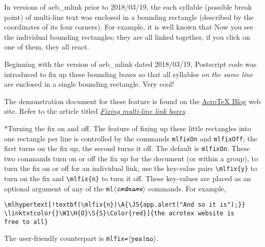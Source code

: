 \documentclass{article}
\makeatletter
\def\amtIndent{15pt}
\def\AcroTeX{Acro\negthinspace\TeX}
\def\anglemeta#1{$\langle\textit{\texttt{#1}}\rangle$}
\let\ameta\anglemeta
\let\pkg\textsf
\def\cs#1{\texttt{\@backslashchar#1}}
\renewcommand{\paragraph}
    {\@startsection{paragraph}{4}{0pt}{6pt}{-3pt}{\bfseries}}
\makeatother
\begin{document}
In versions of \pkg{aeb\_mlink} prior to 2018/03/19, the each syllable
(possible break point) of multi-line text was enclosed in a bounding
rectangle (described by the coordinates of its four corners). For example, it
is well known that  Now you see the individual bounding
rectangles; they are all linked together, if you click on one of them, they
all react.

Beginning with the version of \pkg{aeb\_mlink} dated 2018/03/19, Postscript
code was introduced to fix up these bounding boxes so that all syllables
\emph{on the same line} are enclosed in a single bounding rectangle.
 Very cool!

 The demonstration document for these feature is found on the
\href{\urlAcroTeXBlog}{{\AcroTeX} Blog} web site. Refer to the article
titled \textsl{\href{\urlAcroTeXBlog?p=1377}{Fixing multi-line link boxes}}.


\paragraph*{Turning the fix on and off.} The feature of fixing up these
little rectangles into one rectangle per line is controlled by the commands
\cs{mlfixOn} and \cs{mlfixOff}; the first turns on the fix up, the second
turns it off. The default is \cs{mlfixOn}. These two commands turn on or off
the fix up for the document (or within a group), to turn the fix on or off
for an individual link, use the key-value pairs \verb~\mlfix{y}~ to turn on
the fix and \verb~\mlfix{n}~ to turn it off. These key-values are placed as
an optional argument of any of the \cs{ml\ameta{cmdname}} commands. For
example,
\begin{Verbatim}[xleftmargin=\amtIndent,fontsize=\small,commandchars=!()]
\mlhypertext[!textbf(\mlfix{n})\A{\JS{app.alert("And so it is");}}
\linktxtcolor{}\W1\H{O}\S{S}\Color{red}]{the acrotex website is
free to all}
\end{Verbatim}
The user-friendly counterpart is \texttt{mlfix=\ameta{\upshape{yes|no}}}.
\end{document}
